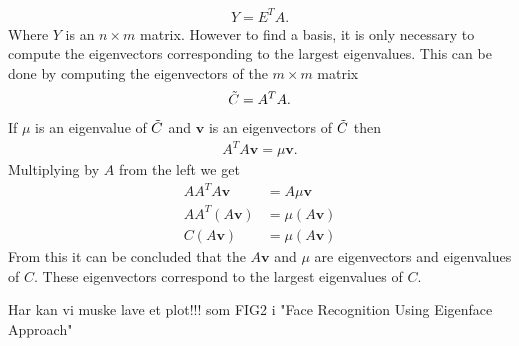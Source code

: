 \begin{align*}
    Y=E^TA.
\end{align*}
Where $Y$ is an $n\times m$ matrix.
However to find a basis, it is only necessary to compute the eigenvectors corresponding to the largest eigenvalues. This can be done by computing the eigenvectors of the $m\times m$ matrix 
\begin{align*}
    \Tilde{C}=A^TA.
\end{align*}
If $\mu$ is an eigenvalue of $\Tilde{C}$ and $\textbf{v}$ is an eigenvectors of $\Tilde{C}$ then
\begin{align*}
    A^TA\textbf{v}=\mu \textbf{v}.
\end{align*}
Multiplying by $A$ from the left we get
\begin{align*}
    AA^TA\textbf{v}&=A\mu \textbf{v}\\
    AA^T(A\textbf{v})&=\mu (A \textbf{v})\\
    C(A\textbf{v})&=\mu (A \textbf{v})
\end{align*}
From this it can be concluded that the $A\textbf{v}$ and $\mu$ are eigenvectors and eigenvalues of $C$. These eigenvectors correspond to the largest eigenvalues of $C$.



 
Har kan vi muske lave et plot!!!  som FIG2 i "Face Recognition Using Eigenface Approach"


